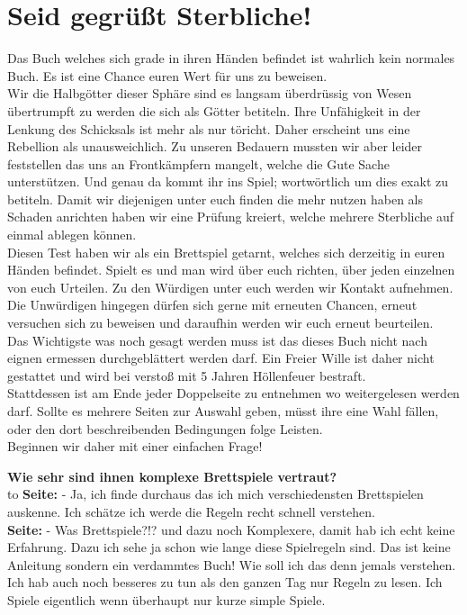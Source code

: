 \documentclass[11pt,a5paper,twoside,openright]{book}
\begin{document}
\newpage


\section*{Seid gegrüßt Sterbliche!}

Das Buch welches sich grade in ihren Händen befindet ist wahrlich kein normales Buch. Es ist eine Chance euren Wert für uns zu beweisen.\\
Wir die Halbgötter dieser Sphäre sind es langsam überdrüssig von Wesen übertrumpft zu werden die sich als Götter betiteln. Ihre Unfähigkeit in der Lenkung des Schicksals ist mehr als nur töricht. Daher erscheint uns eine Rebellion als unausweichlich. Zu unseren Bedauern mussten wir aber leider feststellen das uns an Frontkämpfern mangelt, welche die Gute Sache unterstützen. Und genau da kommt ihr ins Spiel; wortwörtlich um dies exakt zu betiteln.
Damit wir diejenigen unter euch finden die mehr nutzen haben als Schaden anrichten haben wir eine Prüfung kreiert, welche mehrere Sterbliche auf einmal ablegen können.\\
Diesen Test haben wir als ein Brettspiel getarnt, welches sich derzeitig in euren Händen befindet. Spielt es und man wird über euch richten, über jeden einzelnen von euch Urteilen. Zu den Würdigen unter euch werden wir Kontakt aufnehmen. Die Unwürdigen hingegen dürfen sich gerne mit erneuten Chancen, erneut versuchen sich zu beweisen und daraufhin werden wir euch erneut beurteilen.\\

Das Wichtigste was noch gesagt werden muss ist das dieses Buch nicht nach eignen ermessen durchgeblättert werden darf. Ein Freier Wille ist daher nicht gestattet und wird bei verstoß mit 5 Jahren Höllenfeuer bestraft.\\
Stattdessen ist am Ende jeder Doppelseite zu entnehmen wo weitergelesen werden darf. Sollte es mehrere Seiten zur Auswahl geben, müsst ihre eine Wahl fällen, oder den dort beschreibenden Bedingungen folge Leisten.\\
Beginnen wir daher mit einer einfachen Frage!

\vfill

\textbf{Wie sehr sind ihnen komplexe Brettspiele vertraut?} \\
\def\dashfill{\cleaders\hbox{-}\hfill}
\hbox to \hsize{\dashfill\hfil}
\textbf{Seite: \pageref{AnleitungAlt}} - Ja, ich finde durchaus das ich mich verschiedensten Brettspielen auskenne. Ich schätze ich werde die Regeln recht schnell verstehen.\\
\textbf{Seite: \pageref{AnleitungJung}} - Was Brettspiele?!? und dazu noch Komplexere, damit hab ich echt keine Erfahrung. Dazu ich sehe ja schon wie lange diese Spielregeln sind. Das ist keine Anleitung sondern ein verdammtes Buch! Wie soll ich das denn jemals verstehen. Ich hab auch noch besseres zu tun als den ganzen Tag nur Regeln zu lesen. Ich Spiele eigentlich wenn überhaupt nur kurze simple Spiele.
\end{document}
